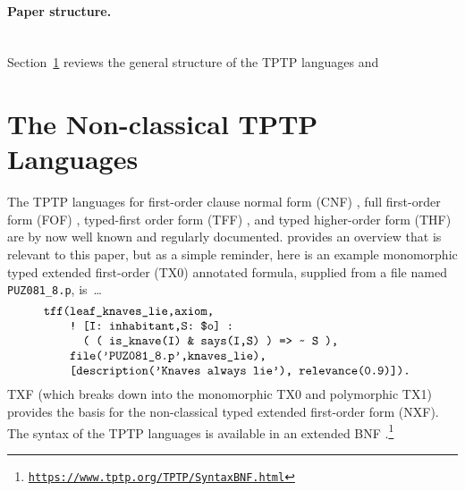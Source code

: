 \documentclass[runningheads]{llncs}
\begin{document}
\paragraph{Paper structure.}~\\
Section~\ref{TPTPLanguages} reviews the general structure of the TPTP languages and

\section{The Non-classical TPTP Languages}
\label{TPTPLanguages}

The TPTP languages for first-order clause normal form (CNF) \cite{SS98-JAR}, full first-order 
form (FOF) \cite{Sut09}, typed-first order form (TFF) \cite{SS+12,BP13-TFF1}, and typed 
higher-order form (THF) \cite{SB10,KSR16} are by now well known and regularly documented.
\cite{SF+22} provides an overview that is relevant to this paper, but as a simple reminder, 
here is an example monomorphic typed extended first-order (TX0) annotated formula, supplied 
from a file named {\tt PUZ081\_8.p}, is~\ldots
\[
\begin{minipage}{\textwidth}
\begin{verbatim}
    tff(leaf_knaves_lie,axiom,
        ! [I: inhabitant,S: $o] : 
          ( ( is_knave(I) & says(I,S) ) => ~ S ),
        file('PUZ081_8.p',knaves_lie),
        [description('Knaves always lie'), relevance(0.9)]).
\end{verbatim}
\end{minipage}
\]
TXF (which breaks down into the monomorphic TX0 and polymorphic TX1) provides the basis for the 
non-classical typed extended first-order form (NXF).
The syntax of the TPTP languages is available in an extended BNF \cite{VS06}.\footnote{%
\label{footnote:tptp}
\href{https://www.tptp.org/TPTP/SyntaxBNF.html}{\tt https://www.tptp.org/TPTP/SyntaxBNF.html}}
\end{document}
